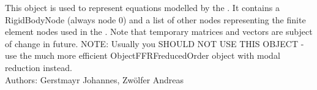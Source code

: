 \ei

%
\newpage


\label{sec:item:ObjectFFRF}
This object is used to represent equations modelled by the . It contains a RigidBodyNode (always node 0) and a list of other nodes representing the finite element nodes used in the . Note that temporary matrices and vectors are subject of change in future. NOTE: Usually you SHOULD NOT USE THIS OBJECT - use the much more efficient ObjectFFRFreducedOrder object with modal reduction instead.
\vspace{12pt}\\

\noindent Authors: Gerstmayr Johannes, Zw\"olfer Andreas
\vspace{12pt}\\

